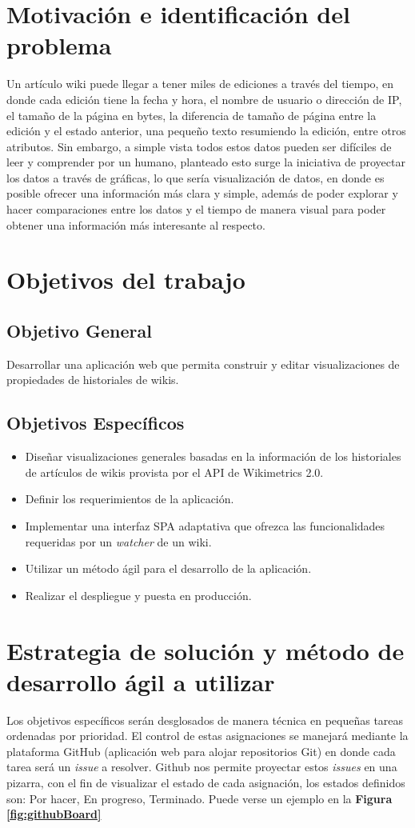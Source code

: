 \section{Motivación e identificación del problema}
Un artículo wiki puede llegar a tener miles de ediciones a través del tiempo, en donde cada edición tiene la fecha y hora, el nombre de usuario o dirección de IP, el tamaño de la página en bytes, la diferencia de tamaño de página entre la edición y el estado anterior, una pequeño texto resumiendo la edición, entre otros atributos. Sin embargo, a simple vista todos estos datos pueden ser difíciles de leer y comprender por un humano, planteado esto surge la iniciativa de proyectar los datos a través de gráficas, lo que sería visualización de datos, en donde es posible ofrecer una información más clara y simple, además de poder explorar y hacer comparaciones entre los datos y el tiempo de manera visual para poder obtener una información más interesante al respecto.

\section{Objetivos del trabajo}
\subsection{Objetivo General}
Desarrollar una aplicación web que permita construir y editar visualizaciones de propiedades de historiales de wikis.
\subsection{Objetivos Específicos}
\begin{itemize}
\item Diseñar visualizaciones generales basadas en la información de los historiales de artículos de wikis provista por el API de Wikimetrics 2.0.
\item Definir los requerimientos de la aplicación.
\item Implementar una interfaz SPA adaptativa que ofrezca las funcionalidades requeridas por un \textit{watcher} de un wiki.
\item Utilizar un método ágil para el desarrollo de la aplicación.
\item Realizar el despliegue y puesta en producción.
\end{itemize}

\section{Estrategia de solución y método de desarrollo ágil a utilizar}
Los objetivos específicos serán desglosados de manera técnica en pequeñas tareas ordenadas por prioridad. El control de estas asignaciones se manejará mediante la plataforma GitHub (aplicación web para alojar repositorios Git) en donde cada tarea será un \textit{issue} a resolver. Github nos permite proyectar estos \textit{issues} en una pizarra, con el fin de visualizar el estado de cada asignación, los estados definidos son: Por hacer, En progreso, Terminado. Puede verse un ejemplo en la \textbf{Figura \ref{fig:githubBoard}}

